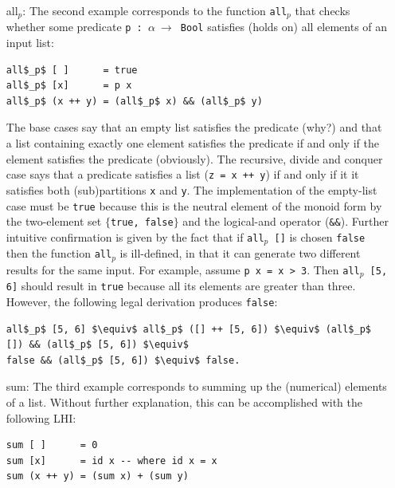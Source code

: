 \documentclass[acmsmall,review]{acmart}\settopmatter{printfolios=true,printccs=false,printacmref=false}
\begin{document}
\begin{itemize}
\item[all$_p$:] The second example corresponds to the function {\tt all$_p$}
            that checks whether some predicate {\tt p : $\alpha ~\rightarrow$ Bool}
            satisfies (holds on) all elements of an input list:
\begin{lstlisting}[mathescape=true]
all$_p$ [ ]      = true
all$_p$ [x]      = p x
all$_p$ (x ++ y) = (all$_p$ x) && (all$_p$ y)   
\end{lstlisting}\vspace{-2ex}
            The base cases say that an empty list satisfies the
            predicate (why?) and that a list containing exactly
            one element satisfies the predicate if and only if
            the element satisfies the predicate (obviously). 
            The recursive, divide and conquer case says that
            a predicate satisfies a list (\lstinline{z = x ++ y}) 
            if and only if it it satisfies both (sub)partitions 
            {\tt x} and {\tt y}.
            The implementation of the empty-list case must be
            \lstinline{true} because this is the neutral element of
            the monoid form by the two-element set 
            {\tt $\{$true, false$\}$} and the logical-and operator (\lstinline{&&}).
            Further intuitive confirmation is given by the fact
            that if {\tt all$_p$ []} is chosen \lstinline{false}
            then the function {\tt all$_p$} is ill-defined,
            in that it can generate two different results for the same
            input. For example, assume \lstinline{p x = x > 3}. Then 
            {\tt all$_p$ [5, 6]} should result in \lstinline{true}
            because all its elements are greater than three. However,
            the following legal derivation produces \lstinline{false}:
\begin{lstlisting}[mathescape=true]
all$_p$ [5, 6] $\equiv$ all$_p$ ([] ++ [5, 6]) $\equiv$ (all$_p$ []) && (all$_p$ [5, 6]) $\equiv$ 
false && (all$_p$ [5, 6]) $\equiv$ false.
\end{lstlisting}

\item[sum:] The third example corresponds to summing up the (numerical) elements
            of a list. Without further explanation, this can be accomplished
            with the following LHI:
\begin{lstlisting}[mathescape=true]
sum [ ]      = 0
sum [x]      = id x -- where id x = x
sum (x ++ y) = (sum x) + (sum y)
\end{lstlisting}\vspace{-2ex}


\end{itemize}
\end{document}
